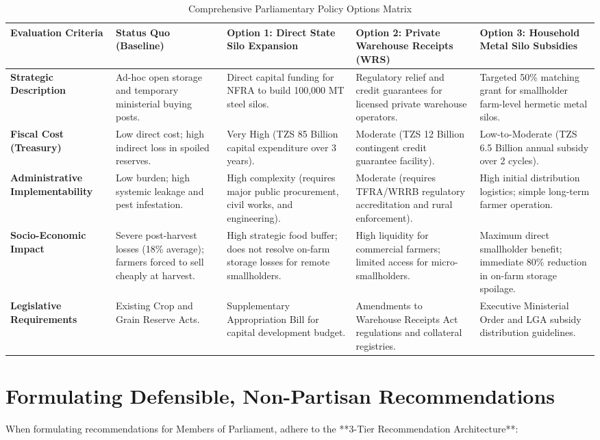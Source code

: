\documentclass[11pt, a4paper]{report}
\begin{document}
\begin{table}[htbp]
\centering
\caption{Comprehensive Parliamentary Policy Options Matrix}
\vspace{0.2cm}
\begin{tabular}{@{}>{\bfseries}p{2.8cm}p{3cm}p{3cm}p{3cm}p{3cm}@{}}
\toprule
Evaluation Criteria & Status Quo (Baseline) & Option 1: Direct State Silo Expansion & Option 2: Private Warehouse Receipts (WRS) & Option 3: Household Metal Silo Subsidies \\
\midrule
Strategic Description & Ad-hoc open storage and temporary ministerial buying posts. & Direct capital funding for NFRA to build 100,000 MT steel silos. & Regulatory relief and credit guarantees for licensed private warehouse operators. & Targeted 50\% matching grant for smallholder farm-level hermetic metal silos. \\
\addlinespace
Fiscal Cost (Treasury) & Low direct cost; high indirect loss in spoiled reserves. & Very High (TZS 85 Billion capital expenditure over 3 years). & Moderate (TZS 12 Billion contingent credit guarantee facility). & Low-to-Moderate (TZS 6.5 Billion annual subsidy over 2 cycles). \\
\addlinespace
Administrative Implementability & Low burden; high systemic leakage and pest infestation. & High complexity (requires major public procurement, civil works, and engineering). & Moderate (requires TFRA/WRRB regulatory accreditation and rural enforcement). & High initial distribution logistics; simple long-term farmer operation. \\
\addlinespace
Socio-Economic Impact & Severe post-harvest losses (18\% average); farmers forced to sell cheaply at harvest. & High strategic food buffer; does not resolve on-farm storage losses for remote smallholders. & High liquidity for commercial farmers; limited access for micro-smallholders. & Maximum direct smallholder benefit; immediate 80\% reduction in on-farm storage spoilage. \\
\addlinespace
Legislative Requirements & Existing Crop and Grain Reserve Acts. & Supplementary Appropriation Bill for capital development budget. & Amendments to Warehouse Receipts Act regulations and collateral registries. & Executive Ministerial Order and LGA subsidy distribution guidelines. \\
\bottomrule
\end{tabular}
\end{table}

\section{Formulating Defensible, Non-Partisan Recommendations}
When formulating recommendations for Members of Parliament, adhere to the **3-Tier Recommendation Architecture**:
\end{document}
